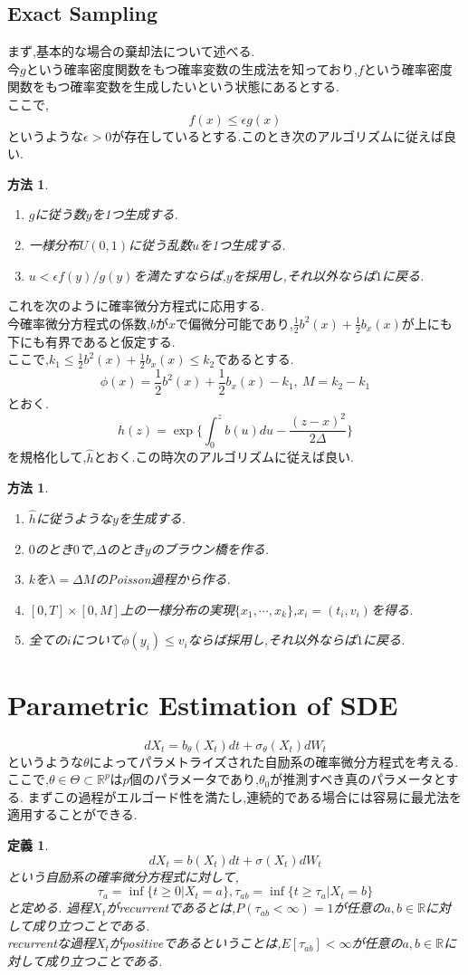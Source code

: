 \documentclass[a4paper,dvipdfmx]{jreport}
\numberwithin{equation}{section}
\newtheorem{Def}     [Thm]{定義}
\newtheorem{Method}[Thm]{方法}
\renewenvironment{leftbar}{%
  \def\FrameCommand{\vrule width 1pt \hspace{10pt}}%
  \MakeFramed {\advance\hsize-\width \FrameRestore}}%
 {\endMakeFramed}
\def\R{\mathbb R}
\def\method{\begin{leftbar}\begin{Method}}
\def\methodx{\end{Method}\end{leftbar}}
\def\defb{\begin{leftbar}\begin{Def}}
\def\defx{\end{Def}\end{leftbar}}
\begin{document}
\subsection{Exact Sampling}
まず,基本的な場合の棄却法について述べる.\\
今$g$という確率密度関数をもつ確率変数の生成法を知っており,$f$という確率密度関数をもつ確率変数を生成したいという状態にあるとする.\\
ここで,\[
f(x) \le \epsilon g(x)
\]
というような$\epsilon >0$が存在しているとする.このとき次のアルゴリズムに従えば良い.
\method
\begin{enumerate}
 \item $g$に従う数$y$を1つ生成する.
 \item 一様分布$U(0,1)$に従う乱数$u$を1つ生成する.
 \item $u < \epsilon f(y)/g(y) $を満たすならば,$y$を採用し,それ以外ならば$1$に戻る.
\end{enumerate}
\methodx
これを次のように確率微分方程式に応用する.\\
今確率微分方程式の係数,$b$が$x$で偏微分可能であり,$\frac{1}{2} b^2(x) + \frac{1}{2}b_x(x)$が上にも下にも有界であると仮定する.\\
ここで,$k_1 \le \frac{1}{2} b^2(x) + \frac{1}{2}b_x(x) \le k_2$であるとする.\\
\[
\phi (x) =\frac{1}{2} b^2(x) + \frac{1}{2}b_x(x) -k_1, \ M= k_2 - k_1
\]
とおく.
\[
h(z) = \exp \biggl \{ \int_0^z b(u)du - \frac{(z-x)^2}{2\Delta} \biggl\}
\]
を規格化して,$\hat{h}$とおく.この時次のアルゴリズムに従えば良い.
\method
\begin{enumerate}
 \item $\hat{h}$に従うような$y$を生成する.
 \item $0$のとき$0$で,$\Delta$のとき$y$のブラウン橋を作る.
 \item $k$を$\lambda=\Delta M$のPoisson過程から作る.
 \item $[0,T]\times [0,M]$上の一様分布の実現$\{x_1,\cdots,x_k\}$,$x_i = (t_i,v_i)$を得る.
 \item 全ての$i$について$\phi(y_i) \le v_i$ならば採用し,それ以外ならば$1$に戻る.
\end{enumerate}
\methodx
\section{Parametric Estimation of SDE}
\[
dX_t = b_\theta (X_t) dt + \sigma_\theta(X_t) dW_t
\]
というような$\theta$によってパラメトライズされた自励系の確率微分方程式を考える.ここで,$\theta \in \Theta \subset \R^p$は$p$個のパラメータであり,$\theta_0$が推測すべき真のパラメータとする.
まずこの過程がエルゴード性を満たし,連続的である場合には容易に最尤法を適用することができる.\\
\defb
\[
dX_t = b (X_t) dt + \sigma (X_t) dW_t
\]
という自励系の確率微分方程式に対して,
\[
\tau_a = \inf \{ t\ge 0 |X_t =a \} , \tau_{ab} = \inf \{ t \ge \tau_a | X_t =b \}
\]
と定める.
過程$X_t$がrecurrentであるとは,$P(\tau_{ab} < \infty) =1$が任意の$a,b\in\R$に対して成り立つことである.\\
recurrentな過程$X_t$がpositiveであるということは,$E[\tau_{ab}] < \infty$が任意の$a,b\in\R$に対して成り立つことである.\\
\defx
\end{document}
